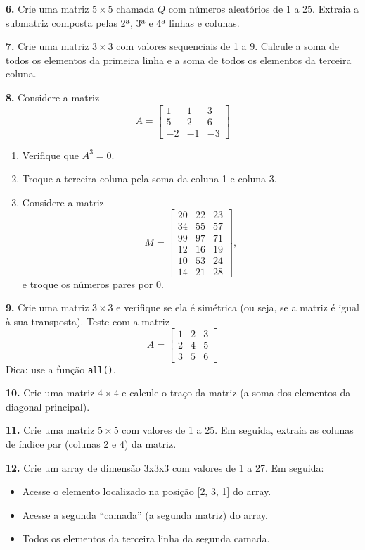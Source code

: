 \documentclass[
]{book}
\providecommand{\tightlist}{%
  \setlength{\itemsep}{0pt}\setlength{\parskip}{0pt}}
\begin{document}
\textbf{6.} Crie uma matriz \(5 \times 5\) chamada \(Q\) com números aleatórios
de 1 a 25. Extraia a submatriz composta pelas 2ª, 3ª e 4ª linhas e
colunas.

\textbf{7.} Crie uma matriz \(3 \times 3\) com valores sequenciais de 1 a 9.
Calcule a soma de todos os elementos da primeira linha e a soma de todos
os elementos da terceira coluna.

\textbf{8.} Considere a matriz \[A = \left[
\begin{matrix}
    1 & 1 & 3 \\
    5 & 2 & 6 \\
    -2 & -1 & -3
\end{matrix}
\right]\]

\begin{enumerate}
\def\labelenumi{(\alph{enumi})}
\item
  Verifique que \(A^3=0\).
\item
  Troque a terceira coluna pela soma da coluna 1 e coluna 3.
\item
  Considere a matriz \[
  M = \left[
  \begin{matrix}
  20 & 22 & 23 \\
  34 & 55 & 57 \\
  99 & 97 & 71 \\
  12 & 16 & 19 \\
  10 & 53 & 24 \\
  14 & 21 & 28
  \end{matrix}
  \right],
  \] e troque os números pares por 0.
\end{enumerate}

\textbf{9.} Crie uma matriz \(3\times 3\) e verifique se ela é simétrica (ou
seja, se a matriz é igual à sua transposta). Teste com a matriz \[A = 
\left[ \begin{matrix}
1 & 2 & 3 \\
2 & 4 & 5 \\
3 & 5 & 6
\end{matrix}\right]\] Dica: use a função \texttt{all()}.

\textbf{10.} Crie uma matriz \(4\times 4\) e calcule o traço da matriz (a soma
dos elementos da diagonal principal).

\textbf{11.} Crie uma matriz \(5\times 5\) com valores de 1 a 25. Em seguida,
extraia as colunas de índice par (colunas 2 e 4) da matriz.

\textbf{12.} Crie um array de dimensão 3x3x3 com valores de 1 a 27. Em
seguida:

\begin{itemize}
\tightlist
\item
  Acesse o elemento localizado na posição {[}2, 3, 1{]} do array.
\item
  Acesse a segunda ``camada'' (a segunda matriz) do array.
\item
  Todos os elementos da terceira linha da segunda camada.
\end{itemize}
\end{document}
